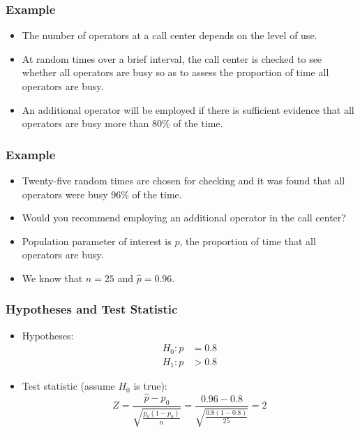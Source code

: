 \documentclass[14pt]{beamer}
\begin{document}
\begin{frame}
	\frametitle{Example}
	
	\begin{itemize}[label={\color{blue}$\blacktriangleright$}]
		\item The number of operators at a call center depends on the level of use.
		
		\item At random times over a brief interval, the call center is checked to see whether all operators are busy so as to assess the proportion of time all operators are busy.
		
		\item An additional operator will be employed if there is sufficient evidence that all operators are busy more than 80\% of the time.
	\end{itemize}
	
\end{frame}
\begin{frame}
	\frametitle{Example}
	
	\begin{itemize}[label={\color{blue}$\blacktriangleright$}]
		\item Twenty-five random times are chosen for checking and it was found that all operators were busy 96\% of the time.
		
		\item Would you recommend employing an additional operator in the call center?
		
		\item Population parameter of interest is $p$, the proportion of time that all operators are busy.
		
		\item We know that $n = 25$ and $\hat{p} = 0.96$.
	\end{itemize}
	
\end{frame}
\begin{frame}
	\frametitle{Hypotheses and Test Statistic}
	
	\begin{itemize}[label={\color{blue}$\blacktriangleright$}]
		\item Hypotheses:
		\[
		\begin{aligned}
			H_0 : p &= 0.8 \\
			H_1 : p &> 0.8
		\end{aligned}
		\]
		
		\item Test statistic (assume $H_0$ is true):
		\[
		Z = \frac{\hat{p} - p_0}{\sqrt{\frac{p_0(1-p_0)}{n}}} = \frac{0.96 - 0.8}{\sqrt{\frac{0.8(1-0.8)}{25}}} = 2
		\]
	\end{itemize}
	
\end{frame}
\end{document}
